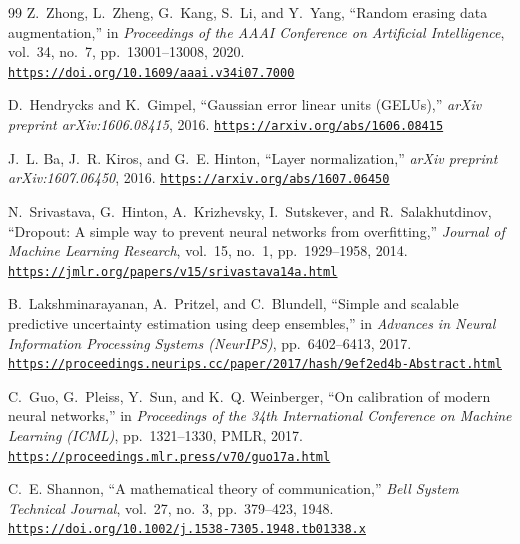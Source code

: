 \documentclass[11pt,a4paper]{article}
\newcommand{\paperurl}[1]{\href{#1}{\underline{\nolinkurl{#1}}}}
\begin{document}
\begin{thebibliography}{99}
Z.~Zhong, L.~Zheng, G.~Kang, S.~Li, and Y.~Yang,
\newblock ``Random erasing data augmentation,''
\newblock in \emph{Proceedings of the AAAI Conference on Artificial Intelligence}, vol.~34, no.~7, pp.~13001--13008, 2020.
\newblock \paperurl{https://doi.org/10.1609/aaai.v34i07.7000}

D.~Hendrycks and K.~Gimpel,
\newblock ``Gaussian error linear units (GELUs),''
\newblock \emph{arXiv preprint arXiv:1606.08415}, 2016.
\newblock \paperurl{https://arxiv.org/abs/1606.08415}

J.~L. Ba, J.~R. Kiros, and G.~E. Hinton,
\newblock ``Layer normalization,''
\newblock \emph{arXiv preprint arXiv:1607.06450}, 2016.
\newblock \paperurl{https://arxiv.org/abs/1607.06450}

N.~Srivastava, G.~Hinton, A.~Krizhevsky, I.~Sutskever, and R.~Salakhutdinov,
\newblock ``Dropout: A simple way to prevent neural networks from overfitting,''
\newblock \emph{Journal of Machine Learning Research}, vol.~15, no.~1, pp.~1929--1958, 2014.
\newblock \paperurl{https://jmlr.org/papers/v15/srivastava14a.html}

B.~Lakshminarayanan, A.~Pritzel, and C.~Blundell,
\newblock ``Simple and scalable predictive uncertainty estimation using deep ensembles,''
\newblock in \emph{Advances in Neural Information Processing Systems (NeurIPS)}, pp.~6402--6413, 2017.
\newblock \paperurl{https://proceedings.neurips.cc/paper/2017/hash/9ef2ed4b-Abstract.html}

C.~Guo, G.~Pleiss, Y.~Sun, and K.~Q. Weinberger,
\newblock ``On calibration of modern neural networks,''
\newblock in \emph{Proceedings of the 34th International Conference on Machine Learning (ICML)}, pp.~1321--1330, PMLR, 2017.
\newblock \paperurl{https://proceedings.mlr.press/v70/guo17a.html}

C.~E. Shannon,
\newblock ``A mathematical theory of communication,''
\newblock \emph{Bell System Technical Journal}, vol.~27, no.~3, pp.~379--423, 1948.
\newblock \paperurl{https://doi.org/10.1002/j.1538-7305.1948.tb01338.x}

\end{thebibliography}
\end{document}
